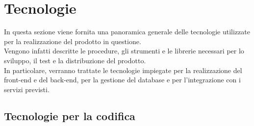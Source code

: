 \pagebreak

\section{Tecnologie}

In questa sezione viene fornita una panoramica generale delle tecnologie utilizzate per la
realizzazione del prodotto in questione. \\
Vengono infatti descritte le procedure, gli strumenti e le librerie necessari per lo sviluppo, il test e la distribuzione del prodotto.\\
In particolare, verranno trattate le tecnologie impiegate per la realizzazione del front-end e del back-end, per la gestione del
database e per l'integrazione con i servizi previsti.

\subsection{Tecnologie per la codifica}

